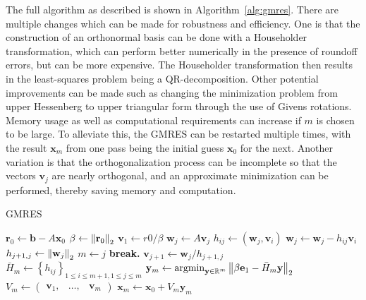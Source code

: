 The full algorithm as described is shown in Algorithm~\ref{alg:gmres}. There are multiple changes which can be made for robustness and efficiency. One is that the construction of an orthonormal basis can be done with a Householder transformation, which can perform better numerically in the presence of roundoff errors, but can be more expensive. The Householder transformation then results in the least-squares problem being a QR-decomposition. Other potential improvements can be made such as changing the minimization problem from upper Hessenberg to upper triangular form through the use of Givens rotations. Memory usage as well as computational requirements can increase if $m$ is chosen to be large. To alleviate this, the GMRES can be restarted multiple times, with the result $\mathbf{x}_m$ from one pass being the initial guess $\mathbf{x}_0$ for the next. Another variation is that the orthogonalization process can be incomplete so that the vectors $\mathbf{v}_j$ are nearly orthogonal, and an approximate minimization can be performed, thereby saving memory and computation.

\begin{algorithm}
	\caption{GMRES}\label{alg:gmres}
	\begin{algorithmic}[1]
            \State $\mathbf{r}_0 \gets \mathbf{b}-A\mathbf{x}_0$
            \State $\beta \gets \left\lVert\mathbf{r}_0\right\rVert_2$
            \State $\mathbf{v}_1 \gets r0/\beta$
              \label{alg:gmres_arnoldi}
                \State $\mathbf{w}_j \gets A \mathbf{v}_j$
                    \State $h_{ij} \gets \left(\mathbf{w}_j, \mathbf{v}_i\right)$
                    \State $\mathbf{w}_j \gets \mathbf{w}_j - h_{ij}\mathbf{v}_i$
                \EndFor
                \State $h_{j+1, j} \gets \left\lVert\mathbf{w}_j\right\rVert_2$
                    \State $m \gets j$
                    \State \textbf{break.}
                \EndIf
                \State $\mathbf{v}_{j+1} \gets \mathbf{w}_j/h_{j+1, j}$
            \EndFor
            \State $\bar{H}_m \gets \left\{h_{ij}\right\}_{1 \leq i \leq m+1, 1\leq j \leq m}$ 
            \State $\mathbf{y}_m  \gets \operatorname*{argmin}_{\mathbf{y} \in \mathbb{R}^m} \left\lVert\beta \mathbf{e}_1 - \bar{H}_m \mathbf{y}\right\rVert_2$ 
            \State $V_m \gets \begin{pmatrix}
                \mathbf{v}_1, & \ldots, & \mathbf{v}_m
            \end{pmatrix}$ 
            \State $\mathbf{x}_m \gets \mathbf{x}_0 + V_m \mathbf{y}_m$
		\EndProcedure
	\end{algorithmic}
\end{algorithm}


